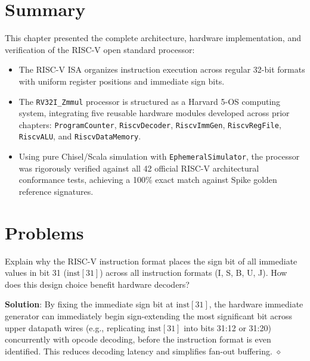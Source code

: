 \section{Summary}\label{riscvSummary}

This chapter presented the complete architecture, hardware implementation, and verification of the RISC-V open standard processor:
\begin{itemize}
    \item The RISC-V ISA organizes instruction execution across regular 32-bit formats with uniform register positions and immediate sign bits.
    \item The \texttt{RV32I\_Zmmul} processor is structured as a Harvard 5-OS computing system, integrating five reusable hardware modules developed across prior chapters: \texttt{ProgramCounter}, \texttt{RiscvDecoder}, \texttt{RiscvImmGen}, \texttt{RiscvRegFile}, \texttt{RiscvALU}, and \texttt{RiscvDataMemory}.
    \item Using pure Chisel/Scala simulation with \texttt{EphemeralSimulator}, the processor was rigorously verified against all 42 official RISC-V architectural conformance tests, achieving a 100\% exact match against Spike golden reference signatures.
\end{itemize}


\section{Problems}\label{riscvProblems}

\begin{problem}
Explain why the RISC-V instruction format places the sign bit of all immediate values in bit 31 ($\text{inst}[31]$) across all instruction formats (I, S, B, U, J). How does this design choice benefit hardware decoders?

\textbf{Solution}:
By fixing the immediate sign bit at $\text{inst}[31]$, the hardware immediate generator can immediately begin sign-extending the most significant bit across upper datapath wires (e.g., replicating $\text{inst}[31]$ into bits 31:12 or 31:20) concurrently with opcode decoding, before the instruction format is even identified. This reduces decoding latency and simplifies fan-out buffering.
$\diamond$
\end{problem}

